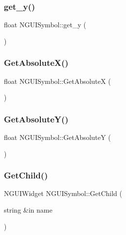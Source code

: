 \hypertarget{class_n_g_u_i_symbol_a2bc07d819b74c557a817ca32262c8531}{}\label{class_n_g_u_i_symbol_a2bc07d819b74c557a817ca32262c8531} 
\subsubsection{\texorpdfstring{get\+\_\+y()}{get\_y()}}
{\footnotesize\ttfamily float N\+G\+U\+I\+Symbol\+::get\+\_\+y (\begin{DoxyParamCaption}{ }\end{DoxyParamCaption})}

\hypertarget{class_n_g_u_i_symbol_a4ae94ca547ad9d0b566587ea3a1d4f65}{}\label{class_n_g_u_i_symbol_a4ae94ca547ad9d0b566587ea3a1d4f65} 
\subsubsection{\texorpdfstring{Get\+Absolute\+X()}{GetAbsoluteX()}}
{\footnotesize\ttfamily float N\+G\+U\+I\+Symbol\+::\+Get\+AbsoluteX (\begin{DoxyParamCaption}{ }\end{DoxyParamCaption})}

\hypertarget{class_n_g_u_i_symbol_a81a3d18fd384affb27e23f713d887d9c}{}\label{class_n_g_u_i_symbol_a81a3d18fd384affb27e23f713d887d9c} 
\subsubsection{\texorpdfstring{Get\+Absolute\+Y()}{GetAbsoluteY()}}
{\footnotesize\ttfamily float N\+G\+U\+I\+Symbol\+::\+Get\+AbsoluteY (\begin{DoxyParamCaption}{ }\end{DoxyParamCaption})}

\hypertarget{class_n_g_u_i_symbol_a2055a22ae5a4a431869f93cb959dad8c}{}\label{class_n_g_u_i_symbol_a2055a22ae5a4a431869f93cb959dad8c} 
\subsubsection{\texorpdfstring{Get\+Child()}{GetChild()}\hspace{0.1cm}{\footnotesize\ttfamily [1/2]}}
{\footnotesize\ttfamily N\+G\+U\+I\+Widget N\+G\+U\+I\+Symbol\+::\+Get\+Child (\begin{DoxyParamCaption}\item[{string \&in}]{name }\end{DoxyParamCaption})}

